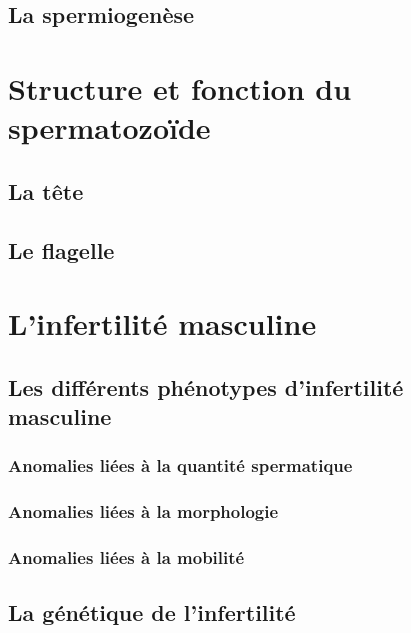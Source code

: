 \documentclass[12pt,twoside]{ugathesis}
\begin{document}
\subsection{La spermiogenèse}\label{spermiogenese}

\section{Structure et fonction du
spermatozoïde}\label{structure-et-fonction-du-spermatozoide}

\subsection{La tête}\label{la-tete}

\subsection{Le flagelle}\label{le-flagelle}

\section{L'infertilité masculine}\label{linfertilite-masculine}

\subsection{Les différents phénotypes d'infertilité
masculine}\label{les-differents-phenotypes-dinfertilite-masculine}

\subsubsection{Anomalies liées à la quantité
spermatique}\label{infquant}

\subsubsection{Anomalies liées à la
morphologie}\label{anomalies-liees-a-la-morphologie}

\subsubsection{Anomalies liées à la
mobilité}\label{anomalies-liees-a-la-mobilite}

\subsection{La génétique de
l'infertilité}\label{la-genetique-de-linfertilite}
\end{document}
